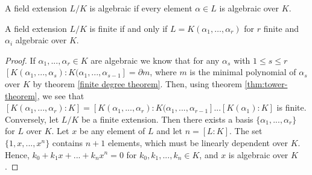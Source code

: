 \begin{definition}
    A field extension $L/K$ is algebraic if every element $\alpha \in L$ is algebraic over $K$. 
\end{definition}

\begin{theorem} \label{thm:finite-equi-def}
    A field extension $L/K$ is finite if and only if $L = K(\alpha_1, \dots, \alpha_r)$ for $r$ finite and $\alpha_i$ algebraic over $K$. 
\end{theorem}

\begin{proof}
    If \(\alpha_1, ... , \alpha_r \in K\) are algebraic we know that for any \(\alpha_s\) with \(1 \leq s \leq r\) \([K(\alpha_1,...,\alpha_s): K(\alpha_1,...,\alpha_{s-1}] = \partial m\), where \(m\) is the minimal polynomial of \(\alpha_s\) over \(K\) by theorem \ref{finite degree theorem}. Then, using theorem \ref{thm:tower-theorem}, we see that \([K(\alpha_1,...,\alpha_r) : K] = [K(\alpha_1,...,\alpha_r):K(\alpha_1,...,\alpha_{r-1}]...[K(\alpha_1):K]\) is finite. Conversely, let \(L/K\) be a finite extension. Then there exists a basis \(\{\alpha_1, ..., \alpha_r\}\) for \(L\) over \(K\). Let \(x\) be any element of \(L\) and let \(n = [L:K]\). The set \(\{1,x,...,x^n\}\) contains \(n+1\) elements, which must be linearly dependent over \(K\). Hence, \(k_0 + k_1 x + ... + k_n x^n = 0\) for \(k_0, k_1, ..., k_n \in K\), and \(x\) is algebraic over \(K\).
\end{proof}



